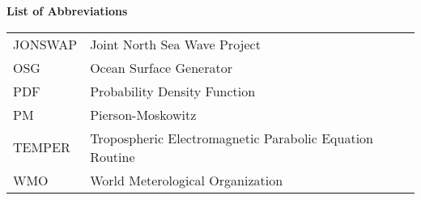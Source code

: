 \noindent\Large{\bf{List of Abbreviations}}

\vspace{24pt}

\small\normalsize

\begin{supertabular}{ll}
JONSWAP & Joint North Sea Wave Project\\
OSG & Ocean Surface Generator \\
PDF & Probability Density Function \\
PM & Pierson-Moskowitz \\
TEMPER & Tropospheric Electromagnetic Parabolic Equation Routine \\
WMO & World Meterological Organization \\
\end{supertabular}
